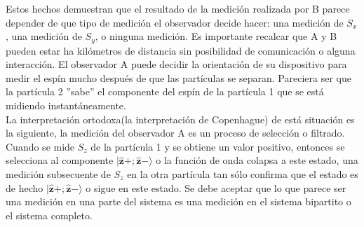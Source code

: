 \documentclass[a4paper]{article}
\begin{document}
Estos hechos demuestran que el resultado de la medición realizada por B parece depender de que tipo de medición el observador decide hacer: una medición de $S_x$, una medición de $S_y$, o ninguna medición. Es importante recalcar que A y B pueden estar ha kilómetros de distancia sin posibilidad de comunicación o alguna interacción. El observador A puede decidir la orientación de su dispositivo para medir el espín mucho después de que las partículas se separan. Pareciera ser que la partícula 2 ''sabe'' el componente del espín de la partícula 1 que se está midiendo instantáneamente. \\
La interpretación ortodoxa(la interpretación de Copenhague) de está situación es la siguiente, la medición del observador A es un proceso de selección o filtrado. Cuando se mide $S_z$ de la partícula 1 y se obtiene un valor positivo, entonces se selecciona al componente $|\mathbf{\hat{z}}+;\mathbf{\hat{z}}-\rangle$ o la función de onda colapsa a este estado, una medición subsecuente de $S_z$ en la otra partícula tan sólo confirma que el estado es de hecho $|\mathbf{\hat{z}}+;\mathbf{\hat{z}}-\rangle$ o sigue en este estado. Se debe aceptar que lo que parece ser una medición en una parte del sistema es una medición en el sistema bipartito o el sistema completo.
\end{document}
